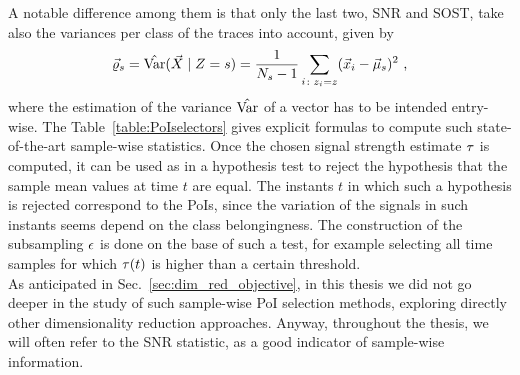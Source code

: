A notable difference among them is that only the last two, SNR and SOST, take also the variances per class of the traces into account, given by
\begin{equation}
\varXclass = \varEst(\given{\vaLeakVec}{\sensRandVar = \sensVarGenValue}) = \frac{1}{\nbTracesPerClass-1}\sum_{i\colon \sensVar_i=\sensVar} (\vLeakVec_i - \mmmXclass)^2 \mbox{ ,}
\end{equation}
where the estimation of the variance $\hat{\mathrm{Var}}$ of a vector has to be intended entry-wise.
The Table~\ref{table:PoIselectors} gives explicit formulas to compute such state-of-the-art sample-wise statistics. Once the chosen signal strength estimate $\tau$ is computed, it can be used as in a hypothesis test to reject the hypothesis that the sample mean values at time $t$ are equal. The instants $t$ in which such a hypothesis is rejected correspond to the PoIs, since the variation of the signals in such instants seems depend on the class belongingness. The construction of the subsampling $\epsilon$ is done on the base of such a test, for example selecting all time samples for which $\tau(t)$ is higher than a certain threshold. \\

As anticipated in Sec.~\ref{sec:dim_red_objective}, in this thesis we did not go deeper in the study of such sample-wise PoI selection methods, exploring directly other dimensionality reduction approaches. Anyway, throughout the thesis, we will often refer to the SNR statistic, as a good indicator of sample-wise information.

